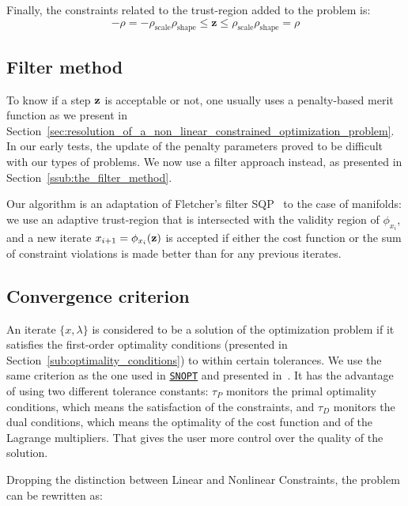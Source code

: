 Finally, the constraints related to the trust-region added to the problem is:
\begin{equation}
  -\rho = -\rho_\text{scale}\rho_\text{shape} \leq \mathbf{z} \leq \rho_\text{scale}\rho_\text{shape} = \rho
\end{equation}

\subsection{Filter method}
\label{sub:filter_method}

To know if a step ${\bf z}$ is acceptable or not, one usually uses a penalty-based merit function as we present in Section~\ref{sec:resolution_of_a_non_linear_constrained_optimization_problem}.
In our early tests, the update of the penalty parameters proved to be difficult with our types of problems.
We now use a filter approach instead, as presented in Section~\ref{ssub:the_filter_method}.

Our algorithm is an adaptation of Fletcher's filter SQP~\cite{fletcher:mathprog:2000} to the case of manifolds: we use an adaptive trust-region that is intersected with the validity region of $\phi_{x_i}$, and a new iterate $x_{i+1} = \phi_{x_i}({\bf z})$ is accepted if either the cost function or the sum of constraint violations is made better than for any previous iterates.

\subsection{Convergence criterion}
\label{sub:convergence_criterion}

An iterate $\{x,\lambda\}$ is considered to be a solution of the optimization problem if it satisfies the first-order optimality conditions (presented in Section~\ref{sub:optimality_conditions}) to within certain tolerances.
We use the same criterion as the one used in \href{http://www.sbsi-sol-optimize.com/asp/sol_product_snopt.htm}{{\tt SNOPT}} and presented in~\cite{gill:snopt:2002}.
It has the advantage of using two different tolerance constants: $\tau_P$ monitors the primal optimality conditions, which means the satisfaction of the constraints, and $\tau_D$ monitors the dual conditions, which means the optimality of the cost function and of the Lagrange multipliers.
That gives the user more control over the quality of the solution.

Dropping the distinction between Linear and Nonlinear Constraints,
the problem can be rewritten as:

